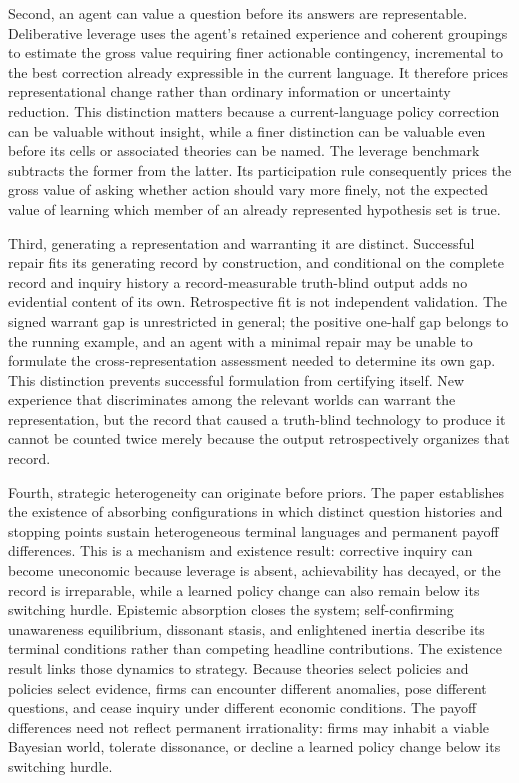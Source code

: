 \documentclass[11pt]{article}
\theoremstyle{definition}
\begin{document}
Second, an agent can value a question before its answers are representable.
Deliberative leverage uses the agent's retained experience and coherent groupings to estimate the gross value requiring finer actionable contingency, incremental to the best correction already expressible in the current language.
It therefore prices representational change rather than ordinary information or uncertainty reduction.
This distinction matters because a current-language policy correction can be valuable without insight, while a finer distinction can be valuable even before its cells or associated theories can be named.
The leverage benchmark subtracts the former from the latter.
Its participation rule consequently prices the gross value of asking whether action should vary more finely, not the expected value of learning which member of an already represented hypothesis set is true.

Third, generating a representation and warranting it are distinct.
Successful repair fits its generating record by construction, and conditional on the complete record and inquiry history a record-measurable truth-blind output adds no evidential content of its own.
Retrospective fit is not independent validation.
The signed warrant gap is unrestricted in general; the positive one-half gap belongs to the running example, and an agent with a minimal repair may be unable to formulate the cross-representation assessment needed to determine its own gap.
This distinction prevents successful formulation from certifying itself.
New experience that discriminates among the relevant worlds can warrant the representation, but the record that caused a truth-blind technology to produce it cannot be counted twice merely because the output retrospectively organizes that record.

Fourth, strategic heterogeneity can originate before priors.
The paper establishes the existence of absorbing configurations in which distinct question histories and stopping points sustain heterogeneous terminal languages and permanent payoff differences.
This is a mechanism and existence result: corrective inquiry can become uneconomic because leverage is absent, achievability has decayed, or the record is irreparable, while a learned policy change can also remain below its switching hurdle.
Epistemic absorption closes the system; self-confirming unawareness equilibrium, dissonant stasis, and enlightened inertia describe its terminal conditions rather than competing headline contributions.
The existence result links those dynamics to strategy.
Because theories select policies and policies select evidence, firms can encounter different anomalies, pose different questions, and cease inquiry under different economic conditions.
The payoff differences need not reflect permanent irrationality: firms may inhabit a viable Bayesian world, tolerate dissonance, or decline a learned policy change below its switching hurdle.
\end{document}
